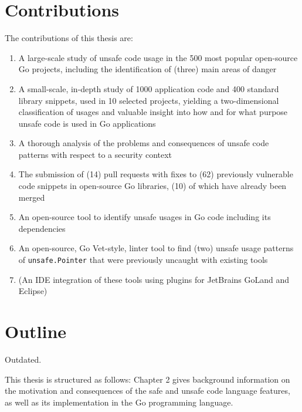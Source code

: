 
\section{Contributions}\label{sec:contributions}

The contributions of this thesis are:

\begin{enumerate}
    \item A large-scale study of unsafe code usage in the 500 most popular open-source Go projects,
    including the identification of (three) main areas of danger
    \item A small-scale, in-depth study of 1000 application code and 400 standard library snippets, used in 10
    selected projects, yielding a two-dimensional classification of usages and valuable insight into how and for what
    purpose unsafe code is used in Go applications
    \item A thorough analysis of the problems and consequences of unsafe code patterns with respect to a security
    context
    \item The submission of (14) pull requests with fixes to (62) previously vulnerable code snippets in open-source Go
    libraries, (10) of which have already been merged
    \item An open-source tool to identify unsafe usages in Go code including its dependencies
    \item An open-source, Go Vet-style, linter tool to find (two) unsafe usage patterns of \texttt{unsafe.Pointer}
    that were previously uncaught with existing tools
    \item (An IDE integration of these tools using plugins for JetBrains GoLand and Eclipse)
\end{enumerate}




\section{Outline}\label{sec:outline}

Outdated.

This thesis is structured as follows: Chapter 2 gives background information on the motivation
and consequences of the safe and unsafe code language features, as well as its implementation
in the Go programming language.

